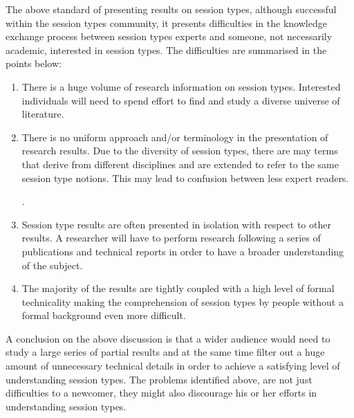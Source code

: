 
The above standard of presenting results on session types,
although successful within the session types community,
it presents difficulties in the knowledge exchange process between 
session types experts and someone, not necessarily academic, interested
in session types. The difficulties are summarised in the points
below:
%
\begin{enumerate}
	\item	There is a huge volume of research information on session types.
			Interested individuals will need to spend effort to find
			and study a diverse universe of literature.

	\item	There is no uniform approach and/or terminology
			in the presentation of research results.
			Due to the diversity of session types,
			there are may terms that derive from different
			disciplines and are extended to refer to
			the same session type notions.
			This may lead to confusion between less
			expert readers.

			.

	\item	Session type results are often presented in
			isolation with respect to other results.
			A researcher will have to perform research
			following a series of publications and
			technical reports in order to have a broader
			understanding of the subject.

	\item	The majority of the results are tightly coupled
			with a high level of formal technicality making the
			comprehension of session types by people without
			a formal background even more difficult.
\end{enumerate}
%
A conclusion on the above discussion is that a wider
audience would need to study a large series of partial
results and at the same time filter out a huge amount
of unnecessary technical details in order to achieve a satisfying
level of understanding session types.
The problems identified above, are not just difficulties
to a newcomer, they might also discourage his or her
efforts in understanding session types.

